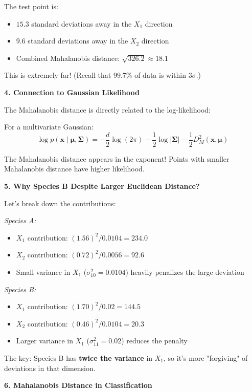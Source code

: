 \documentclass[12pt]{article}
\begin{document}
\begin{explanation}
The test point is:
\begin{itemize}
    \item $15.3$ standard deviations away in the $X_1$ direction
    \item $9.6$ standard deviations away in the $X_2$ direction
    \item Combined Mahalanobis distance: $\sqrt{326.2} \approx 18.1$
\end{itemize}

This is extremely far! (Recall that $99.7\%$ of data is within $3\sigma$.)

\textbf{4. Connection to Gaussian Likelihood}

The Mahalanobis distance is directly related to the log-likelihood:

For a multivariate Gaussian:
\[
\log p(\mathbf{x} \mid \boldsymbol{\mu}, \boldsymbol{\Sigma}) = -\frac{d}{2}\log(2\pi) - \frac{1}{2}\log|\boldsymbol{\Sigma}| - \frac{1}{2}D_M^2(\mathbf{x}, \boldsymbol{\mu})
\]

The Mahalanobis distance appears in the exponent! Points with smaller Mahalanobis distance have higher likelihood.

\textbf{5. Why Species B Despite Larger Euclidean Distance?}

Let's break down the contributions:

\textit{Species A:}
\begin{itemize}
    \item $X_1$ contribution: $(1.56)^2 / 0.0104 = 234.0$
    \item $X_2$ contribution: $(0.72)^2 / 0.0056 = 92.6$
    \item Small variance in $X_1$ ($\sigma_{10}^2 = 0.0104$) heavily penalizes the large deviation
\end{itemize}

\textit{Species B:}
\begin{itemize}
    \item $X_1$ contribution: $(1.70)^2 / 0.02 = 144.5$
    \item $X_2$ contribution: $(0.46)^2 / 0.0104 = 20.3$
    \item Larger variance in $X_1$ ($\sigma_{11}^2 = 0.02$) reduces the penalty
\end{itemize}

The key: Species B has \textbf{twice the variance} in $X_1$, so it's more "forgiving" of deviations in that dimension.

\textbf{6. Mahalanobis Distance in Classification}


\end{explanation}
\end{document}
